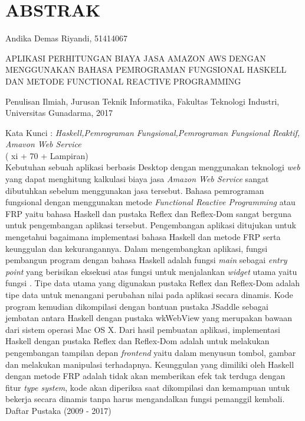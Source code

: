 \documentclass[pi.tex]{subfile}
\begin{document}
\chapter*{ABSTRAK}

{
  \singlespacing
  \setlength{\parskip}{0.5\baselineskip}
  Andika Demas Riyandi, 51414067

  APLIKASI PERHITUNGAN BIAYA JASA AMAZON AWS DENGAN MENGGUNAKAN BAHASA PEMROGRAMAN FUNGSIONAL HASKELL DAN METODE FUNCTIONAL REACTIVE PROGRAMMING

   Penulisan Ilmiah, Jurusan Teknik Informatika, Fakultas Teknologi Industri,\\
   Universitas Gunadarma, 2017

 Kata Kunci : \emph{Haskell,Pemrograman Fungsional,Pemrograman Fungsional Reaktif, Amavon Web Service}\\
( xi + 70 + Lampiran)
\\


Kebutuhan sebuah aplikasi berbasis Desktop dengan menggunakan teknologi \emph{web} yang dapat menghitung kalkulasi biaya jasa \emph{Amazon Web Service} sangat dibutuhkan sebelum menggunakan jasa tersebut. Bahasa pemrograman fungsional dengan menggunakan metode \emph{Functional Reactive Programming} atau FRP yaitu bahasa Haskell dan pustaka Reflex dan Reflex-Dom sangat berguna untuk pengembangan aplikasi tersebut. Pengembangan aplikasi ditujukan untuk mengetahui bagaimana implementasi  bahasa Haskell dan metode FRP serta keunggulan dan kekurangannya. Dalam mengembangkan aplikasi, fungsi pembangun program dengan bahasa Haskell adalah fungsi \emph{main} sebagai \emph{entry point} yang berisikan eksekusi atas fungsi untuk menjalankan \emph{widget} utama yaitu fungsi . Tipe data utama yang digunakan pustaka Reflex dan Reflex-Dom adalah tipe data  untuk menangani perubahan nilai pada aplikasi secara dinamis.  Kode program kemudian dikompilasi dengan bantuan pustaka JSaddle sebagai jembatan antara Haskell dengan pustaka wkWebView yang merupakan bawaan dari sistem operasi Mac OS X. Dari hasil pembuatan aplikasi, implementasi Haskell dengan pustaka Reflex dan Reflex-Dom adalah untuk melakukan pengembangan tampilan depan \emph{frontend} yaitu dalam menyusun tombol, gambar dan melakukan manipulasi terhadapnya. Keunggulan yang dimiliki oleh Haskell dengan metode FRP adalah tidak akan memberikan efek tak terduga dengan fitur \emph{type system}, kode akan diperiksa saat dikompilasi dan kemampuan untuk bekerja secara dinamis tanpa harus mengandalkan fungsi pemanggil kembali.\\

\noindent Daftar Pustaka (2009 - 2017)  
}
\end{document}
